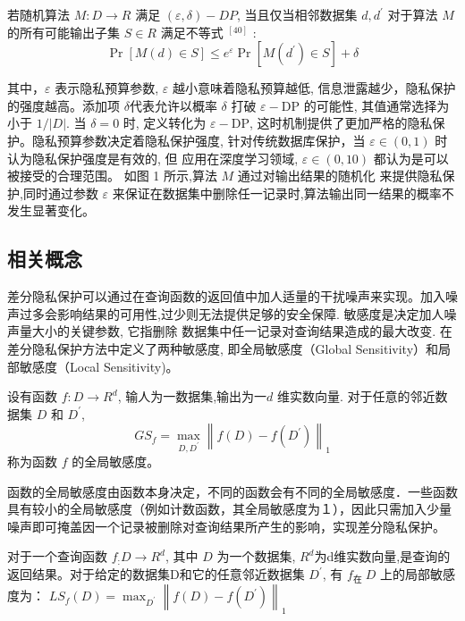 \begin{define}[成立条件]\label{成立条件}

若随机算法 $M: D \rightarrow R$ 满足 $(\varepsilon, \delta)-D P$, 当且仅当相邻数据集 $d, d^{\prime}$ 对于算法 $M$ 的所有可能输出子集 $S \in R$ 满足不等式 $^{[40]}$ :
$$
\operatorname{Pr}[M(d) \in S] \leq e^{\varepsilon} \operatorname{Pr}\left[M\left(d^{\prime}\right) \in S\right]+\delta
$$

其中，$\varepsilon$ 表示隐私预算参数, $\varepsilon$ 越小意味着隐私预算越低, 信息泄露越少，隐私保护的强度越高。添加项 $\delta$代表允许以概率 $\delta$ 打破 $\varepsilon-\mathrm{DP}$ 的可能性, 其值通常选择为小于 $1 /|D|$. 当 $\delta=0$ 时, 定义转化为 $\varepsilon-\mathrm{DP}$, 这时机制提供了更加严格的隐私保护。隐私预算参数决定着隐私保护强度, 针对传统数据库保护，当 $\varepsilon \in(0,1)$ 时认为隐私保护强度是有效的, 但 应用在深度学习领域, $\varepsilon \in(0,10)$ 都认为是可以被接受的合理范围。
如图 1 所示,算法 $M$ 通过对输出结果的随机化 来提供隐私保护,同时通过参数 $\varepsilon$ 来保证在数据集中删除任一记录时,算法输出同一结果的概率不发生显著变化。
\end{define}

\subsection{相关概念}
差分隐私保护可以通过在查询函数的返回值中加人适量的干扰噪声来实现。加入噪声过多会影响结果的可用性,过少则无法提供足够的安全保障. 敏感度是决定加人噪声量大小的关键参数, 它指删除 数据集中任一记录对查询结果造成的最大改变. 在差分隐私保护方法中定义了两种敏感度, 即全局敏感度（Global Sensitivity）和局部敏感度（Local Sensitivity)。

\begin{define}[全局敏感度]\label{全局敏感度}
设有函数 $f: D \rightarrow R^{d}$, 输人为一数据集,输出为一$d$ 维实数向量. 对于任意的邻近数据集 $D$ 和 $D^{\prime}$,
$$
G S_{f}=\max _{D, D^{\prime}}\left\|f(D)-f\left(D^{\prime}\right)\right\|_{1}
$$
称为函数 $f$ 的全局敏感度。
\end{define}

函数的全局敏感度由函数本身决定，不同的函数会有不同的全局敏感度．一些函数具有较小的全局敏感度（例如计数函数，其全局敏感度为１），因此只需加入少量噪声即可掩盖因一个记录被删除对查询结果所产生的影响，实现差分隐私保护。

\begin{define}[局部敏感度]\label{局部敏感度}
对于一个查询函数 $f_{:} D \rightarrow R^{d}$, 其中 $D$ 为一个数据集, $R^{d}$为d维实数向量,是查询的返回结果。对于给定的数据集D和它的任意邻近数据集 $D^{\prime}$, 有 $f_{\text {在 }} D$ 上的局部敏感度为：
$L S_{f}(D)=\max _{D^{\prime}}\left\|f(D)-f\left(D^{\prime}\right)\right\|_{1}$
\end{define}

